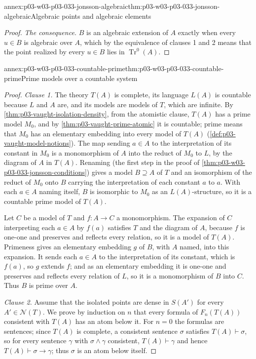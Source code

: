 \begin{annexitem}{annex:p03-w03-p03-033-jonsson-algebraic}{thm:p03-w03-p03-033-jonsson-algebraic}{Algebraic points and algebraic elements}
\begin{proof}
\emph{The consequence.} \(B\) is an algebraic extension of \(A\) exactly
when every \(u\in B\) is algebraic over \(A\), which by the equivalence of
clauses 1 and 2 means that the point realized by every \(u\in B\) lies in
\(\operatorname{Tr}^0(A)\).
\end{proof}
\end{annexitem}

\begin{annexitem}{annex:p03-w03-p03-033-countable-prime}{thm:p03-w03-p03-033-countable-prime}{Prime models over a countable system}
\begin{proof}
\emph{Clause 1.} The theory \(T(A)\) is complete, its language \(L(A)\) is
countable because \(L\) and \(A\) are, and its models are models of \(T\),
which are infinite. By \cref{thm:p03-vaught-isolation-density}, from the
atomistic clause, \(T(A)\) has a prime model \(M_0\), and by
\cref{thm:p03-vaught-prime-atomic} it is countable; prime means that
\(M_0\) has an elementary embedding into every model of \(T(A)\)
(\cref{def:p03-vaught-model-notions}). The map sending \(a\in A\) to the
interpretation of its constant in \(M_0\) is a monomorphism of \(A\) into
the reduct of \(M_0\) to \(L\), by the diagram of \(A\) in \(T(A)\).
Renaming (the first step in the proof of \cref{thm:p03-w03-p03-033-jonsson-conditions}) gives a model
\(B\supseteq A\) of \(T\) and an isomorphism of the reduct of \(M_0\)
onto \(B\) carrying the interpretation of each constant \(a\) to \(a\).
With each \(a\in A\) naming itself, \(B\) is isomorphic to \(M_0\) as an
\(L(A)\)-structure, so it is a countable prime model of \(T(A)\).

Let \(C\) be a model of \(T\) and \(f:A\to C\) a monomorphism. The
expansion of \(C\) interpreting each \(a\in A\) by \(f(a)\) satisfies
\(T\) and the diagram of \(A\), because \(f\) is one-one and preserves and
reflects every relation, so it is a model of \(T(A)\). Primeness gives an
elementary embedding \(g\) of \(B\), with \(A\) named, into this
expansion. It sends each \(a\in A\) to the interpretation of its constant,
which is \(f(a)\), so \(g\) extends \(f\); and as an elementary embedding
it is one-one and preserves and reflects every relation of \(L\), so it is
a monomorphism of \(B\) into \(C\). Thus \(B\) is prime over \(A\).

\emph{Clause 2.} Assume that the isolated points are dense in \(S(A')\)
for every \(A'\in\mathcal N(T)\). We prove by induction on \(n\) that
every formula of \(F_n(T(A))\) consistent with \(T(A)\) has an atom below
it. For \(n=0\) the formulas are sentences; since \(T(A)\) is complete, a
consistent sentence \(\sigma\) satisfies \(T(A)\vdash\sigma\), so for
every sentence \(\gamma\) with \(\sigma\wedge\gamma\) consistent,
\(T(A)\vdash\gamma\) and hence \(T(A)\vdash\sigma\to\gamma\); thus
\(\sigma\) is an atom below itself.


\end{proof}
\end{annexitem}
